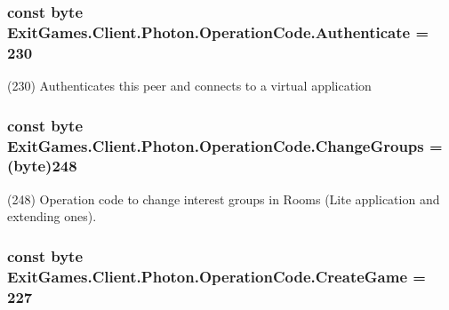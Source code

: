 \subsubsection[{\texorpdfstring{Authenticate}{Authenticate}}]{\setlength{\rightskip}{0pt plus 5cm}const byte Exit\+Games.\+Client.\+Photon.\+Operation\+Code.\+Authenticate = 230}\hypertarget{class_exit_games_1_1_client_1_1_photon_1_1_operation_code_a593c0164845113e55d36c4ab792620b9}{}\label{class_exit_games_1_1_client_1_1_photon_1_1_operation_code_a593c0164845113e55d36c4ab792620b9}


(230) Authenticates this peer and connects to a virtual application

\subsubsection[{\texorpdfstring{Change\+Groups}{ChangeGroups}}]{\setlength{\rightskip}{0pt plus 5cm}const byte Exit\+Games.\+Client.\+Photon.\+Operation\+Code.\+Change\+Groups = (byte)248}\hypertarget{class_exit_games_1_1_client_1_1_photon_1_1_operation_code_ab92f32ca36b9c62c35e2e32c067e6158}{}\label{class_exit_games_1_1_client_1_1_photon_1_1_operation_code_ab92f32ca36b9c62c35e2e32c067e6158}


(248) Operation code to change interest groups in Rooms (Lite application and extending ones).

\subsubsection[{\texorpdfstring{Create\+Game}{CreateGame}}]{\setlength{\rightskip}{0pt plus 5cm}const byte Exit\+Games.\+Client.\+Photon.\+Operation\+Code.\+Create\+Game = 227}\hypertarget{class_exit_games_1_1_client_1_1_photon_1_1_operation_code_a4ec87e6ee50ba49c669644c242053854}{}\label{class_exit_games_1_1_client_1_1_photon_1_1_operation_code_a4ec87e6ee50ba49c669644c242053854}


